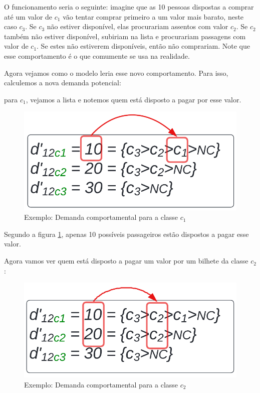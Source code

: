 O funcionamento seria o seguinte: imagine que as 10 pessoas dispostas a comprar até um valor de $c_1$ vão tentar comprar primeiro a um valor mais barato, neste caso $c_3$. Se $c_3$ não estiver disponível, elas procurariam assentos com valor $c_2$. Se $c_2$ também não estiver disponível, subiriam na lista e procurariam passagens com valor de $c_1$. Se estes não estiverem disponíveis, então não comprariam. Note que esse comportamento é o que comumente se usa na realidade.

Agora vejamos como o modelo leria esse novo comportamento. Para isso, calculemos a nova demanda potencial: 

para $c_1$, vejamos a lista e notemos quem está disposto a pagar por esse valor.
\begin{figure}[!ht]
	\begin{center}
		\includegraphics[scale=0.24]{img/dem_compo_c1.png}
		\caption{Exemplo: Demanda comportamental para a classe $c_1$}
		\label{fig: exemplo_dem_c1}
	\end{center}
\end{figure}

Segundo a figura \ref{fig: exemplo_dem_c1}, apenas 10 possíveis passageiros estão dispostos a pagar esse valor.

Agora vamos ver quem está disposto a pagar um valor por um bilhete da classe $c_2$:
\begin{figure}[!ht]
	\begin{center}
		\includegraphics[scale=0.24]{img/dem_compo_c2.png}
		\caption{Exemplo: Demanda comportamental para a classe $c_2$}
		\label{fig: exemplo_dem_c2}
	\end{center}
\end{figure}

